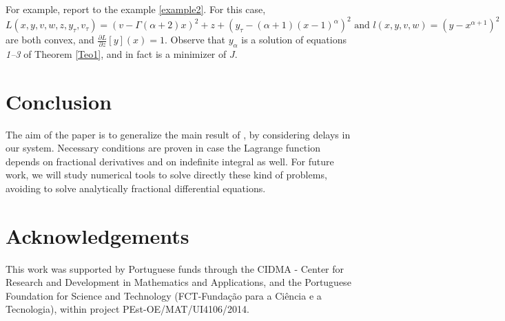 \documentclass[10pt]{article}
\begin{document}
For example, report to the example \ref{example2}. For this case,
$$L(x,y,v,w,z,y_\tau,v_\tau) =(v-\Gamma(\alpha+2)x)^2+z+(y_\tau-(\alpha+1)(x-1)^\alpha)^2\mbox{ and }l(x,y,v,w)=(y-x^{\alpha+1})^2 $$
are both convex, and $\frac{\partial L}{\partial z}[y](x) =1$. Observe that $y_\alpha$ is a solution of equations  \textit{1--3} of Theorem \ref{Teo1}, and in fact is a
minimizer of $J$.

\section{Conclusion}

The aim of the paper is to generalize the main result of \cite{Almeida5}, by considering delays in our system. Necessary conditions are proven in case the Lagrange function depends on fractional derivatives and on indefinite integral as well. For future work, we will study numerical tools to solve directly these kind of problems, avoiding to solve analytically fractional differential equations. 
 

\section*{Acknowledgements}

This work was supported by Portuguese funds through the CIDMA - Center for Research and Development in Mathematics and Applications, and the Portuguese Foundation for Science and Technology (FCT-Funda\c{c}\~{a}o para a Ci\^{e}ncia e a Tecnologia), within project PEst-OE/MAT/UI4106/2014.
\end{document}
